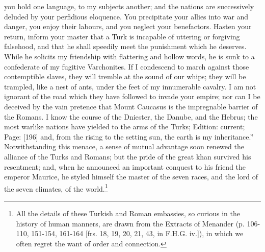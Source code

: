 you hold one language, to my subjects another; and the nations are successively deluded by your perfidious eloquence. You precipitate your allies into war and danger, you enjoy their labours, and you neglect your benefactors. Hasten your return, inform your master that a Turk is incapable of uttering or forgiving falsehood, and that he shall speedily meet the punishment which he deserves. While he solicits my friendship with flattering and hollow words, he is sunk to a confederate of my fugitive Varchonites. If I condescend to march against those contemptible slaves, they will tremble at the sound of our whips; they will be trampled, like a nest of ants, under the feet of my innumerable cavalry. I am not ignorant of the road which they have followed to invade your empire; nor can I be deceived by the vain pretence that Mount Caucasus is the impregnable barrier of the Romans. I know the course of the Dniester, the Danube, and the Hebrus; the most warlike nations have yielded to the arms of the Turks; Edition: current; Page: [196] and, from the rising to the setting sun, the earth is my inheritance.\texthebrew{}” Notwithstanding this menace, a sense of mutual advantage soon renewed the alliance of the Turks and Romans; but the pride of the great khan survived his resentment; and, when he announced an important conquest to his friend the emperor Maurice, he styled himself the master of the seven races, and the lord of the seven climates, of the world.\footnote{All the details of these Turkish and Roman embassies, so curious in the history of human manners, are drawn from the Extracts of Menander (p. 106-110, 151-154, 161-164 [frs. 18, 19, 20, 21, 43, in F.H.G. iv.]), in which we often regret the want of order and connection.}

